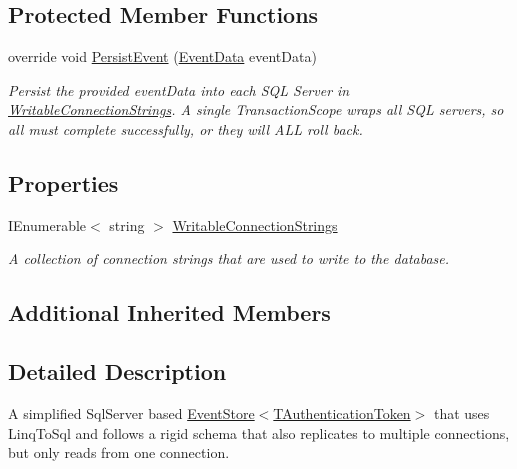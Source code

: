 \subsection*{Protected Member Functions}
\begin{DoxyCompactItemize}
\item 
override void \hyperlink{classCqrs_1_1Events_1_1ReplicatedSqlEventStore_aedff93a62c275a18d45ede6576fe2840_aedff93a62c275a18d45ede6576fe2840}{Persist\+Event} (\hyperlink{classCqrs_1_1Events_1_1EventData}{Event\+Data} event\+Data)
\begin{DoxyCompactList}\small\item\em Persist the provided {\itshape event\+Data}  into each S\+QL Server in \hyperlink{classCqrs_1_1Events_1_1ReplicatedSqlEventStore_ab2811e34d4f19fb0115a96f622050f68_ab2811e34d4f19fb0115a96f622050f68}{Writable\+Connection\+Strings}. A single Transaction\+Scope wraps all S\+QL servers, so all must complete successfully, or they will A\+LL roll back. \end{DoxyCompactList}\end{DoxyCompactItemize}
\subsection*{Properties}
\begin{DoxyCompactItemize}
\item 
I\+Enumerable$<$ string $>$ \hyperlink{classCqrs_1_1Events_1_1ReplicatedSqlEventStore_ab2811e34d4f19fb0115a96f622050f68_ab2811e34d4f19fb0115a96f622050f68}{Writable\+Connection\+Strings}
\begin{DoxyCompactList}\small\item\em A collection of connection strings that are used to write to the database. \end{DoxyCompactList}\end{DoxyCompactItemize}
\subsection*{Additional Inherited Members}


\subsection{Detailed Description}
A simplified Sql\+Server based \hyperlink{classCqrs_1_1Events_1_1EventStore_a6346cb2aea4c5b4e740dc6cfb15abab8_a6346cb2aea4c5b4e740dc6cfb15abab8}{Event\+Store$<$\+T\+Authentication\+Token$>$} that uses Linq\+To\+Sql and follows a rigid schema that also replicates to multiple connections, but only reads from one connection. 


